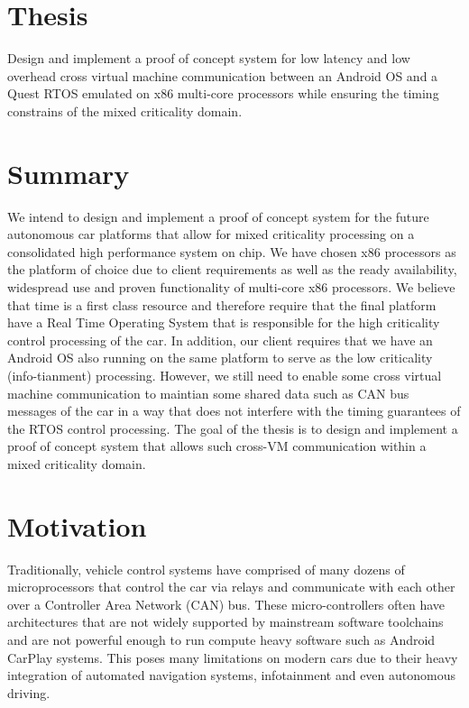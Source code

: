 \documentclass[12pt]{article}
\begin{document}
\tableofcontents
\pagebreak

\section{Thesis}
\begin{center}
\large Design and implement a proof of concept system for low latency and low overhead cross virtual machine communication between an Android OS and a Quest RTOS emulated on x86 multi-core processors while ensuring the timing constrains of the mixed criticality domain.
\end{center}

\section{Summary}
We intend to design and implement a proof of concept system for the future autonomous car platforms that allow for mixed criticality processing on a consolidated high performance system on chip. We have chosen x86 processors as the platform of choice due to client requirements as well as the ready availability, widespread use and proven functionality of multi-core x86 processors. We believe that time is a first class resource and therefore require that the final platform have a Real Time Operating System that is responsible for the high criticality control processing of the car. In addition, our client requires that we have an Android OS also running on the same platform to serve as the low criticality (info-tianment) processing. However, we still need to enable some cross virtual machine communication to maintian some shared data such as CAN bus messages of the car in a way that does not interfere with the timing guarantees of the RTOS control processing. The goal of the thesis is to design and implement a proof of concept system that allows such cross-VM communication within a mixed criticality domain.


\section{Motivation}
Traditionally, vehicle control systems have comprised of many dozens of microprocessors that control the car via relays and communicate with each other over a Controller Area Network (CAN) bus. These micro-controllers often have architectures that are not widely supported by mainstream software toolchains and are not powerful enough to run compute heavy software such as Android CarPlay systems. This poses many limitations on modern cars due to their heavy integration of automated navigation systems, infotainment and even autonomous driving.
\end{document}
